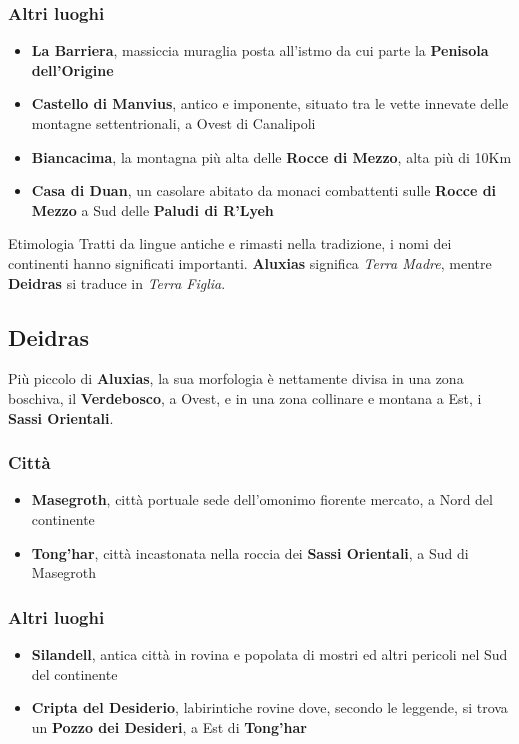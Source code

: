 \documentclass[10pt,twoside,onecolumn,openany]{book}
\begin{document}
\begin{multicols}{2}
\subsubsection{Altri luoghi}
\begin{itemize}
\item \textbf{La Barriera}, massiccia muraglia posta all'istmo da cui parte la \textbf{Penisola dell'Origine}
\item \textbf{Castello di Manvius}, antico e imponente, situato tra le vette innevate delle montagne settentrionali, a Ovest di Canalipoli
\item \textbf{Biancacima}, la montagna più alta delle \textbf{Rocce di Mezzo}, alta più di 10Km
\item \textbf{Casa di Duan}, un casolare abitato da monaci combattenti sulle \textbf{Rocce di Mezzo} a Sud delle \textbf{Paludi di R'Lyeh}
\end{itemize}
\begin{commentbox}{{Etimologia}}
Tratti da lingue antiche e rimasti nella tradizione, i nomi dei continenti hanno significati importanti. \textbf{Aluxias} significa \textit{Terra Madre}, mentre \textbf{Deidras} si traduce in \textit{Terra Figlia}.
\end{commentbox}
\end{multicols}
\subsection{Deidras}
Più piccolo di \textbf{Aluxias}, la sua morfologia è nettamente divisa in una zona boschiva, il \textbf{Verdebosco}, a Ovest, e in una zona collinare e montana a Est, i \textbf{Sassi Orientali}.
\begin{multicols}{2}
\subsubsection{Città}
\begin{itemize}
\item \textbf{Masegroth}, città portuale sede dell'omonimo fiorente mercato, a Nord del continente
\item \textbf{Tong'har}, città incastonata nella roccia dei \textbf{Sassi Orientali}, a Sud di Masegroth
\end{itemize}
\columnbreak
\subsubsection{Altri luoghi}
\begin{itemize}
\item \textbf{Silandell}, antica città in rovina e popolata di mostri ed altri pericoli nel Sud del continente
\item \textbf{Cripta del Desiderio}, labirintiche rovine dove, secondo le leggende, si trova un \textbf{Pozzo dei Desideri}, a Est di \textbf{Tong'har}
\end{itemize}
\end{multicols}
\newpage
\end{document}
